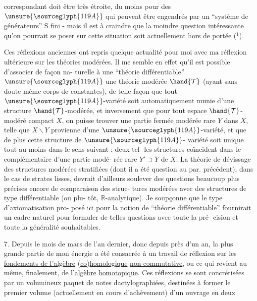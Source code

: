 
correspondant doit être très étroite, du moins pour des $\unsure{\sourceglyph{119A}}$ qui
peuvent être engendrés par un ``système de générateurs'' S fini -
mais il est à craindre que la moindre question intéressante qu'on
pourrait se poser sur cette situation soit actuellement hors de
portée ($^1$).

Ces réflexions anciennes ont repris quelque actualité
pour moi avec ma réflexion ultérieure sur les théories modérées.
Il me semble en effet qu'il est possible d'associer de façon na-%
turelle à une ``théorie différentiable'' $\unsure{\sourceglyph{119A}}$ une théorie modérée $\hand{\mathcal{T}}$
(ayant sans doute même corps de constantes), de telle façon que
tout $\unsure{\sourceglyph{119A}}$-variété soit automatiquement munie d'une structure $\hand{\mathcal{T}}$-modérée,
et inversement que pour tout espace $\hand{\mathcal{T}}$-modéré compact $X$, on puisse
trouver une partie fermée modérée rare $Y$ dans $X$, telle que $X \smallsetminus Y$
provienne d'une $\unsure{\sourceglyph{119A}}$-variété, et que de plus cette structure de $\unsure{\sourceglyph{119A}}$-%
variété soit unique tout au moins dans le sens suivant : deux tel-%
les structures coïncident dans le complémentaire d'une partie modé-%
rée rare $Y' \supset Y$ de $X$. La théorie de dévissage des structures
modérées stratifiées (dont il a été question au par. précédent),
dans le cas de strates lisses, devrait d'ailleurs soulever des
questions beaucoup plus précises encore de comparaison des struc-%
tures modérées avec des structures de type différentiable (ou plu-%
tôt, $\mathbb{R}$-analytique). Je soupçonne que le type d'axiomatisation pro-%
posé ici pour la notion de ``théorie différentiable'' fournirait un
cadre naturel pour formuler de telles questions avec toute la pré-%
cision et toute la généralité souhaitables.


7. Depuis le mois de mars de l'an dernier, donc depuis près
d'un an, la plus grande partie de mon énergie a été consacrée à un
travail de réflexion sur les \uline{fondements de l'algèbre} (\uline{co})\uline{homologique}
\uline{non commutative}, ou ce qui revient au même, finalement, de l'\uline{algèbre}
\uline{homotopique}. Ces réflexions se sont concrétisées par un volumineux
paquet de notes dactylographiées, destinées à former le premier
volume (actuellement en cours d'achèvement) d'un ouvrage en deux

